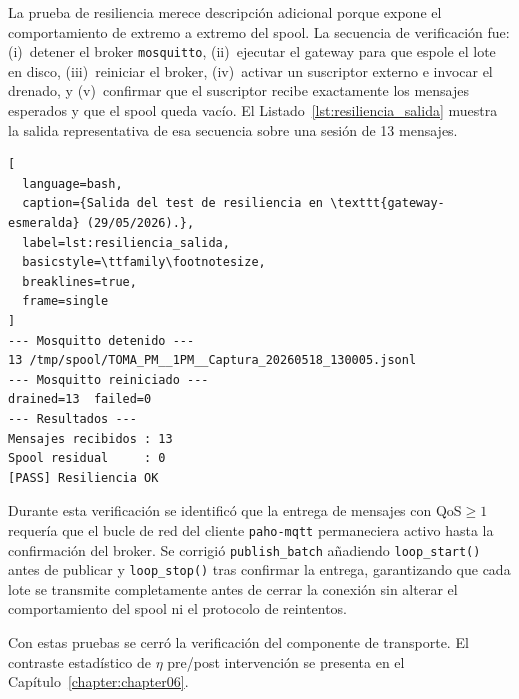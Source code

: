 La prueba de resiliencia merece descripción adicional porque expone el
comportamiento de extremo a extremo del spool. La secuencia de verificación
fue: (i)~detener el broker \texttt{mosquitto}, (ii)~ejecutar el gateway para
que espole el lote en disco, (iii)~reiniciar el broker, (iv)~activar un
suscriptor externo e invocar el drenado, y (v)~confirmar que el suscriptor
recibe exactamente los mensajes esperados y que el spool queda vacío. El
Listado~\ref{lst:resiliencia_salida} muestra la salida representativa de esa
secuencia sobre una sesión de 13 mensajes.

\begin{lstlisting}[
  language=bash,
  caption={Salida del test de resiliencia en \texttt{gateway-esmeralda} (29/05/2026).},
  label=lst:resiliencia_salida,
  basicstyle=\ttfamily\footnotesize,
  breaklines=true,
  frame=single
]
--- Mosquitto detenido ---
13 /tmp/spool/TOMA_PM__1PM__Captura_20260518_130005.jsonl
--- Mosquitto reiniciado ---
drained=13  failed=0
--- Resultados ---
Mensajes recibidos : 13
Spool residual     : 0
[PASS] Resiliencia OK
\end{lstlisting}

Durante esta verificación se identificó que la entrega de mensajes con
\acs{QoS}$\geq 1$ requería que el bucle de red del cliente \texttt{paho-mqtt}
permaneciera activo hasta la confirmación del broker. Se corrigió
\texttt{publish\_batch} añadiendo \texttt{loop\_start()} antes de publicar y
\texttt{loop\_stop()} tras confirmar la entrega, garantizando que cada lote
se transmite completamente antes de cerrar la conexión sin alterar el
comportamiento del spool ni el protocolo de reintentos.

Con estas pruebas se cerró la verificación del componente de transporte. El
contraste estadístico de $\eta$ pre/post intervención se presenta en el
Capítulo~\ref{chapter:chapter06}.
